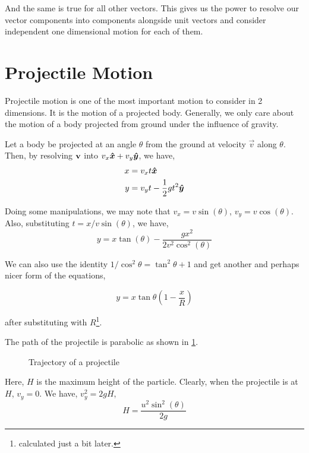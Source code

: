 And the same is true for all other vectors. This gives us the power to
resolve our vector components into components alongside unit vectors
and consider independent one dimensional motion for each of them.

\section{Projectile Motion}

Projectile motion is one of the most important motion to consider in 
2 dimensions. It is the motion of a projected body. Generally, we
only care about the motion of a body projected from ground under the influence
of gravity. 

Let a body be projected at an angle \(\theta\) from the ground at velocity \(\vec{v}\)
along \(\theta\). Then, by resolving \(\boldsymbol{\mathbf{v}}\) into \(v_x \boldsymbol{\hat{x}} + v_y\boldsymbol{\hat{y}}\),
we have, 
\begin{align*}
    x &= v_xt \boldsymbol{\hat{x}} \\
    y &= v_yt - \frac{1}{2}gt^2 \boldsymbol{\hat{y}}
\end{align*}

Doing some manipulations, we may note that \(v_x = v\sin(\theta)\), \(v_y = v\cos(\theta)\).
Also, substituting \(t = x/v\sin(\theta)\), we have,
\begin{equation}
    \boxed{y = x\tan(\theta) - \frac{gx^2}{2v^2\cos^2(\theta)}}
\end{equation}

We can also use the identity \(1/\cos^2\theta = \tan^2\theta + 1\) and get another and 
perhaps nicer form of the equations,

\begin{equation}
    \boxed{y = x\tan\theta\left(1 - \frac{x}{R}\right)}
\end{equation}

after substituting with \(R\)\footnote{calculated just a bit later.}.

The path of the projectile is parabolic as shown in \cref{fig: projectile}.

\begin{figure}[H]
    \centering
    \caption{Trajectory of a projectile}
    \label{fig: projectile}
\end{figure}

Here, \(H\) is the maximum height of the particle. Clearly,
when the projectile is at \(H\), \(v_y = 0\). We have, 
\(v_y^2 = 2gH\),
\begin{equation}
    H = \frac{u^2\sin^2(\theta)}{2g}
\end{equation}


